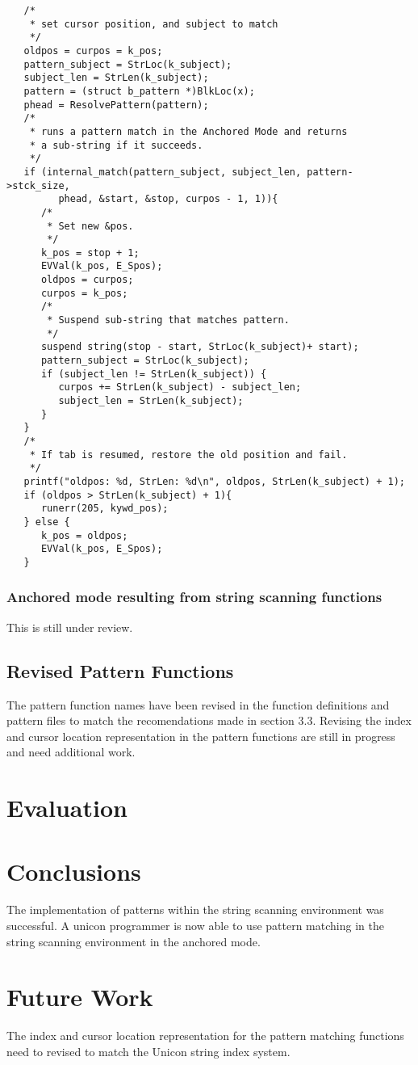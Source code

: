 \documentclass{article}
\begin{document}
\begin{verbatim}
   /*
    * set cursor position, and subject to match
    */
   oldpos = curpos = k_pos;
   pattern_subject = StrLoc(k_subject);
   subject_len = StrLen(k_subject);
   pattern = (struct b_pattern *)BlkLoc(x);
   phead = ResolvePattern(pattern);
   /*
    * runs a pattern match in the Anchored Mode and returns
    * a sub-string if it succeeds.
    */	
   if (internal_match(pattern_subject, subject_len, pattern->stck_size,
         phead, &start, &stop, curpos - 1, 1)){
      /*
       * Set new &pos.
       */ 
      k_pos = stop + 1;
      EVVal(k_pos, E_Spos);	
      oldpos = curpos;
      curpos = k_pos;
      /*
       * Suspend sub-string that matches pattern.
       */
      suspend string(stop - start, StrLoc(k_subject)+ start);
      pattern_subject = StrLoc(k_subject);
      if (subject_len != StrLen(k_subject)) {
         curpos += StrLen(k_subject) - subject_len;
         subject_len = StrLen(k_subject);
      }
   }
   /*
    * If tab is resumed, restore the old position and fail.
    */
   printf("oldpos: %d, StrLen: %d\n", oldpos, StrLen(k_subject) + 1);
   if (oldpos > StrLen(k_subject) + 1){
      runerr(205, kywd_pos);
   } else {
      k_pos = oldpos;
      EVVal(k_pos, E_Spos);
   }
\end{verbatim}

\subsubsection{Anchored mode resulting from string scanning functions}
This is still under review.

\subsection{Revised Pattern Functions}
The pattern function names have been revised in the function definitions and pattern files to match the recomendations made in section 3.3.  Revising the index and cursor location representation in the pattern functions are still in progress and need additional work.

\section{Evaluation}

\section{Conclusions}
The implementation of patterns within the string scanning environment was successful.  A unicon programmer is now able to use pattern matching in the string scanning environment in the anchored mode.

\section{Future Work}
The index and cursor location representation for the pattern matching functions need to revised to match the Unicon string index system.

\pagebreak


\end{document}
